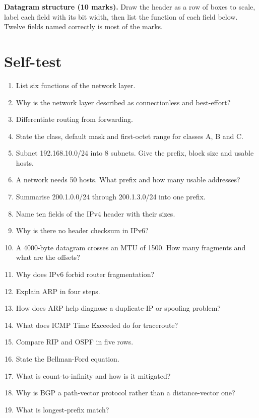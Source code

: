 \documentclass[11pt,a4paper]{article}
\begin{document}
\begin{answerbox}
\textbf{Datagram structure (10 marks).} Draw the header as a row of boxes to scale, label each field with its bit width, then list the function of each field below. Twelve fields named correctly is most of the marks.
\end{answerbox}

\section{Self-test}

\begin{enumerate}
\item List six functions of the network layer.
\item Why is the network layer described as connectionless and best-effort?
\item Differentiate routing from forwarding.
\item State the class, default mask and first-octet range for classes A, B and C.
\item Subnet 192.168.10.0/24 into 8 subnets. Give the prefix, block size and usable hosts.
\item A network needs 50 hosts. What prefix and how many usable addresses?
\item Summarise 200.1.0.0/24 through 200.1.3.0/24 into one prefix.
\item Name ten fields of the IPv4 header with their sizes.
\item Why is there no header checksum in IPv6?
\item A 4000-byte datagram crosses an MTU of 1500. How many fragments and what are the offsets?
\item Why does IPv6 forbid router fragmentation?
\item Explain ARP in four steps.
\item How does ARP help diagnose a duplicate-IP or spoofing problem?
\item What does ICMP Time Exceeded do for traceroute?
\item Compare RIP and OSPF in five rows.
\item State the Bellman-Ford equation.
\item What is count-to-infinity and how is it mitigated?
\item Why is BGP a path-vector protocol rather than a distance-vector one?
\item What is longest-prefix match?
\end{enumerate}
\end{document}

